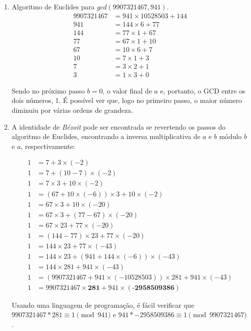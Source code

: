 \documentclass[12pt]{article}
\begin{document}
\begin{enumerate}[label=\textbf{\alph*})]
    \setlength\itemsep{1em}

    \item Algoritmo de Euclides para $gcd(9907321467, 941)$.
        \begin{align*}
            9907321467 &= 941 \times 10528503+144 \\
            941 &= 144 \times 6+77 \\
            144 &= 77 \times 1+67 \\
            77 &= 67 \times 1+10 \\
            67 &= 10 \times 6+7 \\
            10 &= 7 \times 1+3 \\
            7 &= 3 \times 2+1 \\
            3 &= 1 \times 3+0
        \end{align*}

        Sendo no próximo passo $b = 0$, o valor final de $a$ e, portanto, o GCD
        entre os dois números, 1. É possível ver que, logo no primeiro passo, o
        maior número diminuiu por várias ordens de grandeza.

    \item A identidade de \textit{Bézoit} pode ser encontrada se revertendo os
        passos do algoritmo de Euclides, encontrando a inversa multiplicativa
        de $a$ e $b$ módulo $b$ e $a$, respectivamente:

        \begin{align*}
            1 &= 7 + 3 \times (-2) \\
            1 &= 7 + (10-7) \times (-2) \\
            1 &= 7 \times 3 + 10 \times (-2) \\
            1 &= (67 + 10 \times (-6)) \times 3 + 10 \times (-2) \\
            1 &= 67 \times 3 + 10 \times (-20) \\
            1 &= 67 \times 3 + (77-67) \times (-20) \\
            1 &= 67 \times 23 + 77 \times (-20) \\
            1 &= (144-77) \times 23 + 77 \times (-20) \\
            1 &= 144 \times 23 + 77 \times (-43) \\
            1 &= 144 \times 23 + (941 + 144 \times (-6)) \times (-43) \\
            1 &= 144 \times 281 + 941 \times (-43) \\
            1 &= (9907321467 + 941 \times (-10528503)) \times 281 + 941 \times (-43) \\
            1 &= 9907321467 \times \textbf{281} + 941 \times (\textbf{-2958509386})
        \end{align*}

        Usando uma linguagem de programação, é fácil verificar que
        $9907321467 * 281 \equiv 1 \pmod{941}$ e
        $941 * -2958509386 \equiv 1 \pmod{9907321467}$.
\end{enumerate}
\end{document}

